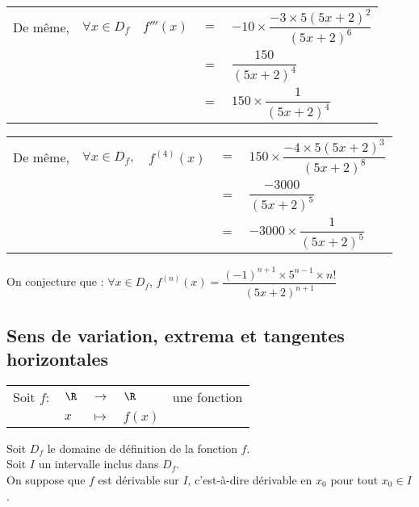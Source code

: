\begin{tabular}{lllll}
De même, & $\forall x \in D_f$ & $f'''(x)$ & $=$ & $-10 \times \dfrac{-3 \times 5\left(5x+2\right)^2}{\left(5x+2\right)^6}$ \vspace*{.3cm} \\
& & & $=$ & $\dfrac{150}{\left(5x+2\right)^4}$ \vspace*{.3cm} \\
& & & $=$ & $150 \times \dfrac{1}{\left(5x+2\right)^4}$ \vspace*{.3cm} \\
\end{tabular}

\begin{tabular}{lllll}
De même,& $\forall x \in D_f,$ & $f^{(4)}(x)$ & $=$ & $150 \times \dfrac{-4 \times 5\left(5x+2\right)^3}{\left(5x+2\right)^8}$ \vspace*{.3cm} \\
& & & $=$ & $\dfrac{-3000}{\left(5x+2\right)^5}$ \vspace*{.3cm} \\
& & & $=$ & $-3000 \times \dfrac{1}{\left(5x+2\right)^5}$ \vspace*{.3cm} \\
\end{tabular}

\vspace*{.3cm} 

On conjecture que : $\forall x \in D_f$, $f^{(n)}(x) =  \dfrac{\left(-1\right)^{n+1} \times 5^{n-1} \times n!}{\left(5x+2\right)^{n+1}}$ \\

\newpage


\subsection{Sens de variation, extrema et tangentes horizontales}

\begin{tabular}{lllll}
Soit $f :$ & $\R$ & $\longrightarrow$ & $\R$ & une fonction \\
& $x$ & $\longmapsto$ & $f(x)$ & \\
\end{tabular}

\vspace*{.3cm}

Soit $D_f$ le domaine de définition de la fonction $f$. \\
Soit $I$ un intervalle inclus dans $D_f$. \\
On suppose que $f$ est dérivable sur $I$, c'est-à-dire dérivable en $x_0$ pour tout $x_0 \in I$. 

